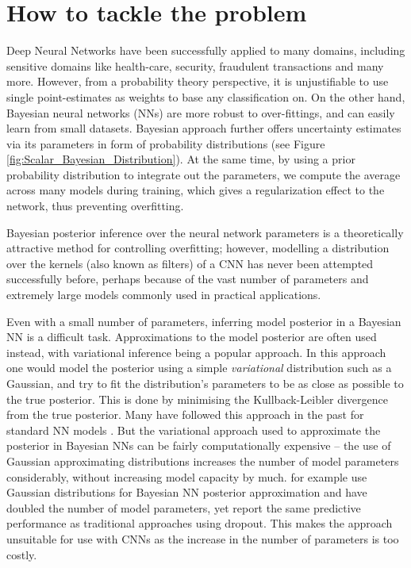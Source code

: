 \section{How to tackle the problem}

Deep Neural Networks have been successfully applied to many domains, including sensitive domains like health-care, security, fraudulent transactions and many more. However, from a probability theory perspective, it is unjustifiable to use single point-estimates as weights to base any classification on.
On the other hand, Bayesian neural networks (NNs) are more robust to over-fittings, and can easily learn from small datasets. Bayesian approach further offers uncertainty estimates via its parameters in form of probability distributions (see Figure \ref{fig:Scalar_Bayesian_Distribution}). At the same time, by using a prior probability distribution to integrate out the parameters, we compute the average across many models during training, which gives a regularization effect to the network, thus preventing overfitting.


Bayesian posterior inference over the neural network parameters is a theoretically attractive method for controlling overfitting; however, modelling a distribution over the kernels (also known as filters) of a CNN has never been attempted successfully before, perhaps because of the vast number of parameters and extremely large models commonly used in practical applications.

Even with a small number of parameters, inferring model posterior in a Bayesian NN is a difficult task. Approximations to the model posterior are often used instead, with variational inference being a popular approach. In this approach one would model the posterior using a simple \textit{variational} distribution such as a Gaussian, and try to fit the distribution's parameters to be as close as possible to the true posterior. This is done by minimising the Kullback-Leibler divergence from the true posterior. Many have followed this approach in the past for standard NN models \citep{hinton1993keeping,barber1998ensemble,graves2011practical,blundell2015weight}.
But the variational approach used to approximate the posterior in Bayesian NNs can be fairly computationally expensive -- the use of Gaussian approximating distributions increases the number of model parameters considerably, without increasing model capacity by much. \citet{blundell2015weight} for example use Gaussian distributions for Bayesian NN posterior approximation and have doubled the number of model parameters, yet report the same predictive performance as traditional approaches using dropout. This makes the approach unsuitable for use with CNNs as the increase in the number of parameters is too costly.


